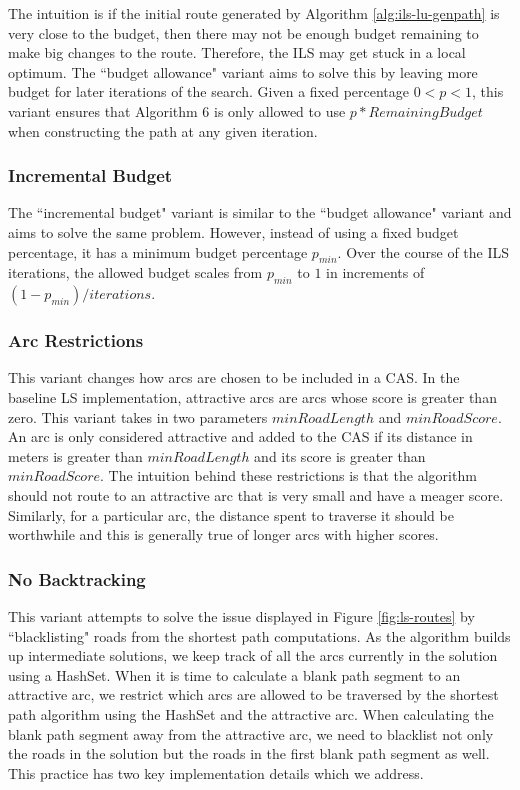 \documentclass[11pt]{article}
\begin{document}
The intuition is if the initial route generated by Algorithm \ref{alg:ils-lu-genpath} is very close to the budget, then there may not be enough budget remaining to make big changes to the route. Therefore, the ILS may get stuck in a local optimum. The ``budget allowance" variant aims to solve this by leaving more budget for later iterations of the search. Given a fixed percentage $0 < p < 1$, this variant ensures that Algorithm 6 is only allowed to use $p * RemainingBudget$ when constructing the path at any given iteration. 

\subsubsection{Incremental Budget}
The ``incremental budget" variant is similar to the ``budget allowance" variant and aims to solve the same problem. However, instead of using a fixed budget percentage, it has a minimum budget percentage $p_{min}$. Over the course of the ILS iterations, the allowed budget scales from $p_{min}$ to $1$ in increments of $(1 - p_{min}) / iterations$. 

\subsubsection{Arc Restrictions}
This variant changes how arcs are chosen to be included in a CAS. In the baseline LS implementation, attractive arcs are arcs whose score is greater than zero. This variant takes in two parameters $minRoadLength$ and $minRoadScore$. An arc is only considered attractive and added to the CAS if its distance in meters is greater than $minRoadLength$ and its score is greater than $minRoadScore$. The intuition behind these restrictions is that the algorithm should not route to an attractive arc that is very small and have a meager score. Similarly, for a particular arc, the distance spent to traverse it should be worthwhile and this is generally true of longer arcs with higher scores. 

\subsubsection{No Backtracking}
This variant attempts to solve the issue displayed in Figure \ref{fig:ls-routes} by ``blacklisting" roads from the shortest path computations. As the algorithm builds up intermediate solutions, we keep track of all the arcs currently in the solution using a HashSet. When it is time to calculate a blank path segment to an attractive arc, we restrict which arcs are allowed to be traversed by the shortest path algorithm using the HashSet and the attractive arc. When calculating the blank path segment away from the attractive arc, we need to blacklist not only the roads in the solution but the roads in the first blank path segment as well. This practice has two key implementation details which we address.
\end{document}
